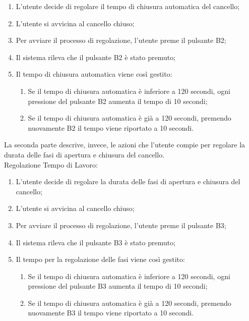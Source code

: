 \begin{enumerate}
    \item L’utente decide di regolare il tempo di chiusura automatica del cancello;
    \item L’utente si avvicina al cancello chiuso;
    \item Per avviare il processo di regolazione, l’utente preme il pulsante B2;
    \item Il sistema rileva che il pulsante B2 è stato premuto;
    \item Il tempo di chiusura automatica viene così gestito:
    
    \begin{enumerate}
        \item Se il tempo di chiusura automatica è inferiore a 120 secondi, ogni pressione del pulsante B2 aumenta il tempo di 10 secondi;
        \item Se il tempo di chiusura automatica è già a 120 secondi, premendo nuovamente B2 il tempo viene riportato a 10 secondi. \\
    \end{enumerate}
\end{enumerate}

La seconda parte descrive, invece, le azioni che l’utente compie per regolare la durata delle fasi di apertura e chiusura del cancello. \\

\noindent Regolazione Tempo di Lavoro:

\begin{enumerate}
    \item L’utente decide di regolare la durata delle fasi di apertura e chiusura del cancello;
    \item L’utente si avvicina al cancello chiuso;
    \item Per avviare il processo di regolazione, l’utente preme il pulsante B3;
    \item Il sistema rileva che il pulsante B3 è stato premuto;
    \item Il tempo per la regolazione delle fasi viene così gestito:
    \begin{enumerate}
        \item Se il tempo di chiusura automatica è inferiore a 120 secondi, ogni pressione del pulsante B3 aumenta il tempo di 10 secondi;
        \item Se il tempo di chiusura automatica è già a 120 secondi, premendo nuovamente B3 il tempo viene riportato a 10 secondi. \\
    \end{enumerate}
\end{enumerate}

